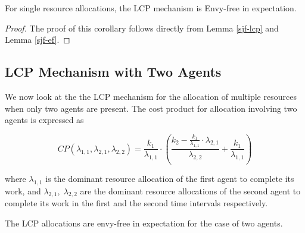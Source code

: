 \documentclass[letterpaper]{article} %
\theoremstyle{definition}
\newenvironment{customlemma}[1]
  {\renewcommand\theinnercustomlemma{#1}\innercustomlemma}
  {\endinnercustomlemma}
\newenvironment{customcorollary}[1]
  {\renewcommand\theinnercustomcorollary{#1}\innercustomcorollary}
  {\endinnercustomcorollary}
\begin{document}
\begin{customcorollary}{A.3} \label{single-res-ef}
For single resource allocations, the LCP mechanism is Envy-free in expectation.
\end{customcorollary}

\begin{proof}
The proof of this corollary follows directly from Lemma \ref{sjf-lcp} and Lemma \ref{sjf-ef}.
\end{proof}

\subsection{LCP Mechanism with Two Agents} \label{lcp-2-agents}

We now look at the the LCP mechanism for the allocation of multiple resources when only two agents are present. The cost product for allocation involving two agents is expressed as\\  
\begin{linenomath}
\begin{equation*}
    CP(\lambda_{1,1}, \lambda_{2,1}, \lambda_{2,2}) = \dfrac{k_{1}}{\lambda_{1,1}} \cdot \left(\displaystyle  \frac{k_{2} - \displaystyle \frac{k_{1}}{\lambda_{1,1}} \cdot \lambda_{2,1}}{\lambda_{2,2}} + \frac{k_{1}}{\lambda_{1,1}} \right)
\end{equation*}
\end{linenomath}

\noindent where $\lambda_{1,1}$ is the dominant resource allocation of the first agent to complete its work, and $\lambda_{2,1}, \; \lambda_{2,2}$ are the dominant resource allocations of the second agent to complete its work in the first and the second time intervals respectively. 

\begin{customlemma}{B.1} \label{lcp-2-agents-ef}
The LCP allocations are envy-free in expectation for the case of two agents.
\end{customlemma}
\end{document}
